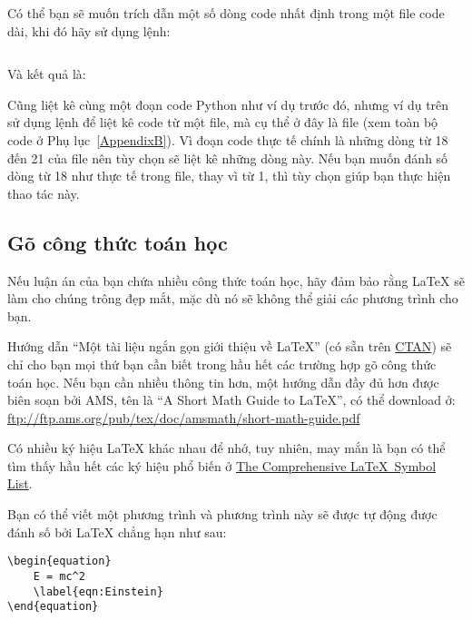 Có thể bạn sẽ muốn trích dẫn một số dòng code nhất định trong một file code dài, khi đó hãy sử dụng lệnh:

\begin{Verbatim}

\end{Verbatim}

Và kết quả là:


Cũng liệt kê cùng một đoạn code Python như ví dụ trước đó, nhưng ví dụ trên sử dụng lệnh \verb|| để liệt kê code từ một file, mà cụ thể ở đây là file  (xem toàn bộ code ở Phụ lục~\ref{AppendixB}). Vì đoạn code thực tế chính là những dòng từ 18 đến 21 của file  nên tùy chọn  sẽ liệt kê những dòng này. Nếu bạn muốn đánh số dòng từ 18 như thực tế trong file, thay vì từ 1, thì tùy chọn  giúp bạn thực hiện thao tác này.


\subsection{Gõ công thức toán học}

Nếu luận án của bạn chứa nhiều công thức toán học, hãy đảm bảo rằng \LaTeX{} sẽ làm cho chúng trông đẹp mắt, mặc dù nó sẽ không thể giải các phương trình cho bạn.

Hướng dẫn \enquote{Một tài liệu ngắn gọn giới thiệu về \LaTeX} (có sẵn trên \href{https://mirror.kku.ac.th/CTAN/info/lshort/vietnamese/lshort-vi.pdf}{CTAN}) sẽ chỉ cho bạn mọi thứ bạn cần biết trong hầu hết các trường hợp gõ công thức toán học. Nếu bạn cần nhiều thông tin hơn, một hướng dẫn đầy đủ hơn được biên soạn bởi AMS, tên là \enquote{A Short Math Guide to \LaTeX}, có thể download ở:\\
\url{ftp://ftp.ams.org/pub/tex/doc/amsmath/short-math-guide.pdf}

Có nhiều ký hiệu \LaTeX{} khác nhau để nhớ, tuy nhiên, may mắn là bạn có thể tìm thấy hầu hết các ký hiệu phổ biến ở \href{http://ctan.org/pkg/comprehensive}{The Comprehensive \LaTeX~Symbol List}.

Bạn có thể viết một phương trình và phương trình này sẽ được tự động được đánh số bởi \LaTeX{} chẳng hạn như sau:
\begin{Verbatim}
\begin{equation}
	E = mc^2
	\label{eqn:Einstein}
\end{equation}
\end{Verbatim}

